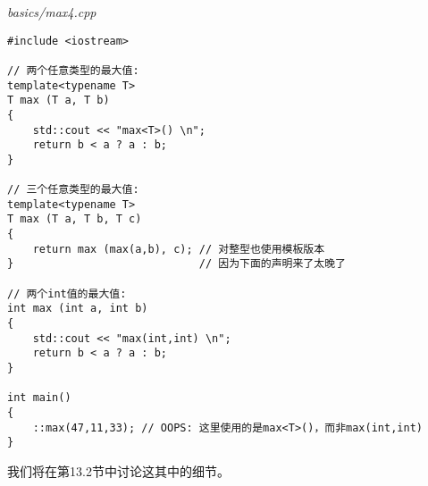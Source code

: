 \noindent
\textit{basics/max4.cpp}
\begin{lstlisting}[style=styleCXX]
#include <iostream>

// 两个任意类型的最大值:
template<typename T>
T max (T a, T b)
{
	std::cout << "max<T>() \n";
	return b < a ? a : b;
}

// 三个任意类型的最大值:
template<typename T>
T max (T a, T b, T c)
{
	return max (max(a,b), c); // 对整型也使用模板版本
}                             // 因为下面的声明来了太晚了
                              
// 两个int值的最大值:
int max (int a, int b)
{
	std::cout << "max(int,int) \n";
	return b < a ? a : b;
}

int main()
{
	::max(47,11,33); // OOPS: 这里使用的是max<T>()，而非max(int,int)
}
\end{lstlisting}

我们将在第13.2节中讨论这其中的细节。


